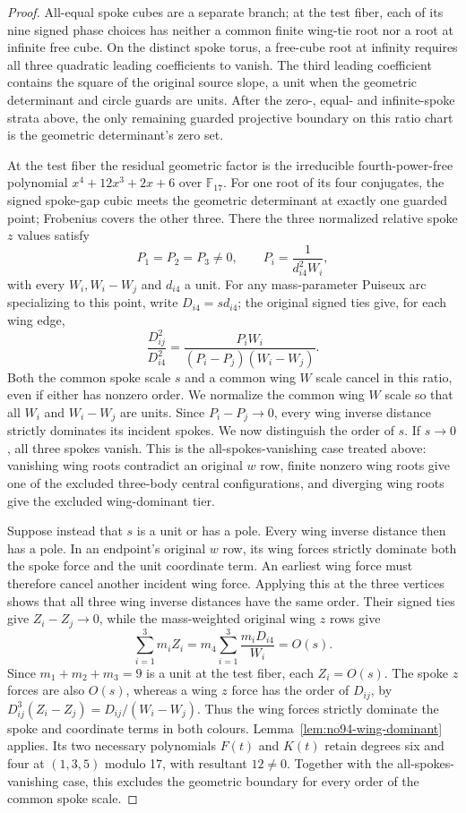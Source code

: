 \documentclass[11pt]{amsart}
\theoremstyle{remark}
\begin{document}
\begin{proof}
All-equal spoke cubes are a separate branch; at the test fiber, each of its nine signed phase choices has neither a common finite wing-tie root nor a root at infinite free cube. On the distinct spoke torus, a free-cube root at infinity requires all three quadratic leading coefficients to vanish. The third leading coefficient contains the square of the original source slope, a unit when the geometric determinant and circle guards are units. After the zero-, equal- and infinite-spoke strata above, the only remaining guarded projective boundary on this ratio chart is the geometric determinant's zero set.

At the test fiber the residual geometric factor is the irreducible fourth-power-free polynomial $x^4+12x^3+2x+6$ over $\mathbb F_{17}$. For one root of its four conjugates, the signed spoke-gap cubic meets the geometric determinant at exactly one guarded point; Frobenius covers the other three. There the three normalized relative spoke $z$ values satisfy
\[
P_1=P_2=P_3\ne0,\qquad P_i=\frac1{d_{i4}^2W_i},
\]
with every $W_i,W_i-W_j$ and $d_{i4}$ a unit. For any mass-parameter Puiseux arc specializing to this point, write $D_{i4}=sd_{i4}$; the original signed ties give, for each wing edge,
\[
\frac{D_{ij}^2}{D_{i4}^2}
=\frac{P_iW_i}{(P_i-P_j)(W_i-W_j)}.
\]
Both the common spoke scale $s$ and a common wing $W$ scale cancel in this ratio, even if either has nonzero order. We normalize the common wing $W$ scale so that all $W_i$ and $W_i-W_j$ are units. Since $P_i-P_j\to0$, every wing inverse distance strictly dominates its incident spokes. We now distinguish the order of $s$. If $s\to0$, all three spokes vanish. This is the all-spokes-vanishing case treated above: vanishing wing roots contradict an original $w$ row, finite nonzero wing roots give one of the excluded three-body central configurations, and diverging wing roots give the excluded wing-dominant tier.

Suppose instead that $s$ is a unit or has a pole. Every wing inverse distance then has a pole. In an endpoint's original $w$ row, its wing forces strictly dominate both the spoke force and the unit coordinate term. An earliest wing force must therefore cancel another incident wing force. Applying this at the three vertices shows that all three wing inverse distances have the same order. Their signed ties give $Z_i-Z_j\to0$, while the mass-weighted original wing $z$ rows give
\[
\sum_{i=1}^3m_iZ_i
=m_4\sum_{i=1}^3\frac{m_iD_{i4}}{W_i}
=O(s).
\]
Since $m_1+m_2+m_3=9$ is a unit at the test fiber, each $Z_i=O(s)$. The spoke $z$ forces are also $O(s)$, whereas a wing $z$ force has the order of $D_{ij}$, by $D_{ij}^3(Z_i-Z_j)=D_{ij}/(W_i-W_j)$. Thus the wing forces strictly dominate the spoke and coordinate terms in both colours. Lemma~\ref{lem:no94-wing-dominant} applies. Its two necessary polynomials $F(t)$ and $K(t)$ retain degrees six and four at $(1,3,5)$ modulo 17, with resultant $12\ne0$. Together with the all-spokes-vanishing case, this excludes the geometric boundary for every order of the common spoke scale.


\end{proof}
\end{document}
